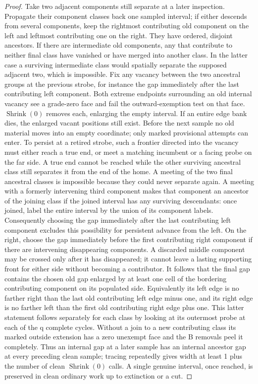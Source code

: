 \begin{proof}
Take two adjacent components still separate at a later inspection. Propagate their component classes back one sampled interval; if either descends from several components, keep the rightmost contributing old component on the left and leftmost contributing one on the right. They have ordered, disjoint ancestors. If there are intermediate old components, any that contribute to neither final class have vanished or have merged into another class. In the latter case a surviving intermediate class would spatially separate the supposed adjacent two, which is impossible. Fix any vacancy between the two ancestral groups at the previous strobe, for instance the gap immediately after the last contributing left component. Both extreme endpoints surrounding an old internal vacancy see a grade-zero face and fail the outward-exemption test on that face. \(\operatorname{Shrink}(0)\) removes each, enlarging the empty interval. If an entire edge bank dies, the enlarged vacant positions still exist. Before the next sample no old material moves into an empty coordinate; only marked provisional attempts can enter. To persist at a retired strobe, such a frontier directed into the vacancy must either reach a true end, or meet a matching incumbent or a facing probe on the far side. A true end cannot be reached while the other surviving ancestral class still separates it from the end of the home. A meeting of the two final ancestral classes is impossible because they could never separate again. A meeting with a formerly intervening third component makes that component an ancestor of the joining class if the joined interval has any surviving descendants: once joined, label the entire interval by the union of its component labels. Consequently choosing the gap immediately after the last contributing left component excludes this possibility for persistent advance from the left. On the right, choose the gap immediately before the first contributing right component if there are intervening disappearing components. A discarded middle component may be crossed only after it has disappeared; it cannot leave a lasting supporting front for either side without becoming a contributor. It follows that the final gap contains the chosen old gap enlarged by at least one cell of the bordering contributing component on its populated side. Equivalently its left edge is no farther right than the last old contributing left edge minus one, and its right edge is no farther left than the first old contributing right edge plus one. This latter statement follows separately for each class by looking at its outermost probe at each of the q complete cycles. Without a join to a new contributing class its marked outside extension has a zero unexempt face and the B removals peel it completely. Thus an internal gap at a later sample has an internal ancestor gap at every preceding clean sample; tracing repeatedly gives width at least 1 plus the number of clean \(\operatorname{Shrink}(0)\) calls. A single genuine interval, once reached, is preserved in clean ordinary work up to extinction or a cut.


\end{proof}
